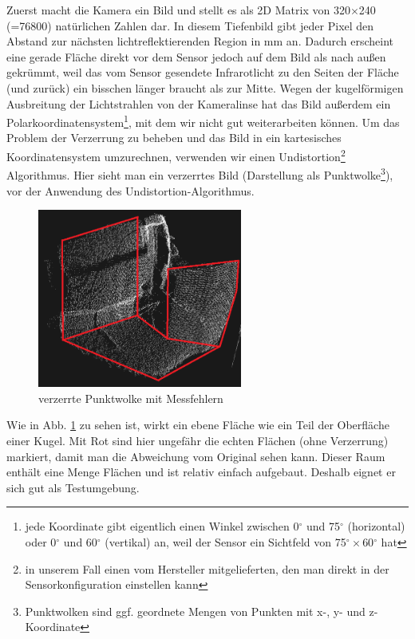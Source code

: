 \documentclass[a4paper,12pt,ngerman]{scrartcl}
\begin{document}
Zuerst macht die Kamera ein Bild und stellt es als 2D Matrix von 320$\times$240 (=76800) natürlichen Zahlen dar.
In diesem Tiefenbild gibt jeder Pixel den Abstand zur nächsten lichtreflektierenden Region in mm an. 
Dadurch erscheint eine gerade Fläche direkt vor dem Sensor jedoch auf dem Bild als nach außen gekrümmt, 
weil das vom Sensor gesendete Infrarotlicht zu den Seiten der Fläche (und zurück) ein bisschen länger
braucht als zur Mitte. Wegen der kugelförmigen Ausbreitung der Lichtstrahlen von der Kameralinse hat das
Bild außerdem ein Polarkoordinatensystem\footnote{jede Koordinate gibt eigentlich einen Winkel zwischen
	0$^{\circ}$ und 75$^{\circ}$ (horizontal) oder 0$^{\circ}$ und 60$^{\circ}$ (vertikal) an,
		weil der Sensor ein Sichtfeld von 75$^{\circ}\times$60$^{\circ}$ hat}, mit dem wir nicht
gut weiterarbeiten können. Um das Problem der Verzerrung zu beheben und das Bild in ein kartesisches
Koordinatensystem umzurechnen, verwenden wir einen Undistortion\footnote{in unserem Fall einen
	vom Hersteller mitgelieferten, den man direkt in der Sensorkonfiguration einstellen kann} Algorithmus.
Hier sieht man ein verzerrtes Bild (Darstellung als Punktwolke\footnote{Punktwolken sind ggf. geordnete Mengen
von Punkten mit x-, y- und z-Koordinate}), vor der Anwendung des Undistortion-Algorithmus.
\begin{figure}[H] \label{distorted_pointcloud_img}
	\centering
	\includegraphics[width=0.6\textwidth]{no_undistortion2}
	\caption{verzerrte Punktwolke mit Messfehlern}
\end{figure}
Wie in Abb. \ref{distorted_pointcloud_img} zu sehen ist, wirkt ein ebene Fläche wie ein Teil der Oberfläche einer Kugel. Mit Rot sind hier ungefähr die echten Flächen (ohne Verzerrung) markiert, damit man die 
Abweichung vom Original sehen kann. Dieser Raum enthält eine Menge 
Flächen und ist relativ einfach aufgebaut. Deshalb eignet er sich gut als Testumgebung.
\end{document}
